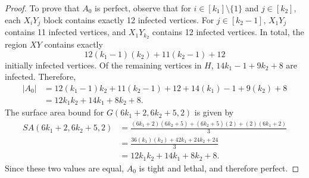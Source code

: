 \begin{proof}
To prove that $A_0$ is perfect, observe that for $i \in [k_1] \setminus \{1\}$ and $j \in [k_2]$, each $X_iY_j$ block contains exactly 12 infected vertices. For $j \in [k_2 -1]$, $X_1Y_j$ contains 11 infected vertices, and $X_1Y_{k_2}$ contains 12 infected vertices. In total, the region $XY$ contains exactly 
$$12(k_1-1)(k_2) + 11(k_2-1) + 12$$
initially infected vertices. Of the remaining vertices in $H$, $14k_1 - 1 +9k_2 + 8$ are infected. Therefore, 
\begin{align*}
|A_0| &= 12(k_1-1)k_2 + 11(k_2-1) + 12+14(k_1) - 1 +9(k_2) + 8 \\
&= 12k_1k_2 + 14k_1 + 8k_2 +8.
\end{align*}
The surface area bound for $G(6k_1+2,6k_2+5,2)$ is given by
\begin{align*}
SA(6k_1+2,6k_2+5,2) &= \frac{(6k_1+2)(6k_2 + 5) + (6k_2+5)(2) + (2)(6k_1+2)}{3} \\
&= \frac{36(k_1)(k_2) +42k_1 +24k_2 + 24}{3} \\
&= 12k_1k_2 +14k_1+8k_2+8.
\end{align*}
Since these two values are equal, $A_0$ is tight and lethal, and therefore perfect.
\end{proof}

